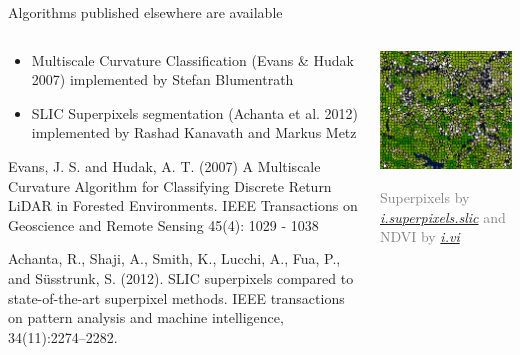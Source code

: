 \documentclass[xcolor={dvipsnames,usenames},beamer,aspectratio=169]{beamer}
\newcommand{\gmodule}[1]{\href{http://grass.osgeo.org/grass74/manuals/#1.html}{\emph{#1}}}
\begin{document}
\begin{frame}{Algorithms published elsewhere are available}

\begin{columns}
\begin{column}{0.5\textwidth}

\begin{itemize}
  \item Multiscale Curvature Classification (Evans \& Hudak 2007) implemented by Stefan Blumentrath
  \item SLIC Superpixels segmentation (Achanta et al. 2012) implemented by Rashad Kanavath and Markus Metz
\end{itemize}

\bigskip
\footnoterule
\tiny

Evans, J. S. and Hudak, A. T. (2007) A Multiscale Curvature Algorithm for Classifying Discrete Return LiDAR in Forested Environments. IEEE Transactions on Geoscience and Remote Sensing 45(4): 1029 - 1038

Achanta, R., Shaji, A., Smith, K., Lucchi, A., Fua, P., and Süsstrunk, S. (2012). SLIC superpixels compared to state-of-the-art superpixel methods. IEEE transactions on pattern analysis and machine intelligence, 34(11):2274–2282.

\end{column}

\begin{column}{0.5\textwidth}
\centering
\includegraphics[width=\textwidth]{i_superpixels_slic_ndvi}

\textcolor{gray}{
\footnotesize
Superpixels by \gmodule{i.superpixels.slic} and NDVI by \gmodule{i.vi}
}

\end{column}
\end{columns}

\end{frame}
\end{document}

